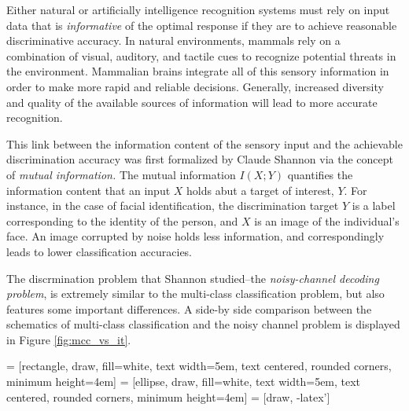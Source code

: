 Either natural or artificially intelligence recognition systems
must rely on input data that is \emph{informative} of the optimal
response if they are to achieve reasonable discriminative accuracy.
In natural environments, mammals rely on a combination of visual,
auditory, and tactile cues to recognize potential threats in the
environment.  Mammalian brains integrate all of this sensory
information in order to make more rapid and reliable decisions.
Generally, increased diversity and quality of the available sources of
information will lead to more accurate recognition.

This link between the information content of the sensory input and the
achievable discrimination accuracy was first formalized by Claude
Shannon via the concept of \emph{mutual information.}  The mutual
information $I(X; Y)$ quantifies the information content that an input
$X$ holds abut a target of interest, $Y$.  For instance, in the case
of facial identification, the discrimination target $Y$ is a label
corresponding to the identity of the person, and $X$ is an image of
the individual's face.  An image corrupted by noise holds less
information, and correspondingly leads to lower classification
accuracies.

The discrmination problem that Shannon studied--the
\emph{noisy-channel decoding problem}, is extremely similar to the
multi-class classification problem, but also features some important
differences.  A side-by side comparison between the schematics of
multi-class classification and the noisy channel problem is displayed
in Figure \ref{fig:mcc_vs_it}.

 = [rectangle, draw, fill=white, 
    text width=5em, text centered, rounded corners, minimum height=4em]
 = [ellipse, draw, fill=white, 
    text width=5em, text centered, rounded corners, minimum height=4em]
 = [draw, -latex']
    
